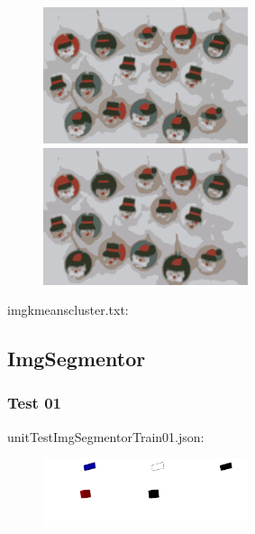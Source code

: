 \begin{center}
\begin{figure}[H]
\centering\includegraphics[width=6cm]{./imgkmeanscluster06-04.png}
\centering\includegraphics[width=6cm]{./imgkmeanscluster06-05.png}\\
\end{figure}
\end{center}

imgkmeanscluster.txt:\\
\begin{scriptsize}
\begin{ttfamily}

\end{ttfamily}
\end{scriptsize}

\subsection{ImgSegmentor}

\subsubsection{Test 01}

unitTestImgSegmentorTrain01.json:\\
\begin{scriptsize}
\begin{ttfamily}

\end{ttfamily}
\end{scriptsize}
\begin{center}
\begin{figure}[H]
\centering\includegraphics[width=6cm]{imgSegmentorTest01.png}
\end{figure}
\end{center}

